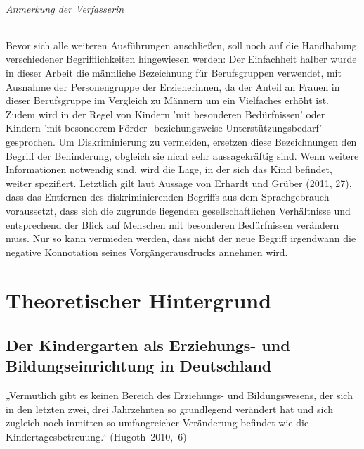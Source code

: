 \paragraph{Anmerkung der Verfasserin}
Bevor sich alle weiteren Ausführungen anschließen, soll noch auf die Handhabung verschiedener Begrifflichkeiten hingewiesen werden: Der Einfachheit halber wurde in dieser Arbeit die männliche Bezeichnung für Berufsgruppen verwendet, mit Ausnahme der Personengruppe der Erzieherinnen, da der Anteil an Frauen in dieser Berufsgruppe im Vergleich zu Männern um ein Vielfaches erhöht ist. 
Zudem wird in der Regel von Kindern 'mit besonderen Bedürfnissen' oder Kindern 'mit besonderem Förder- beziehungsweise Unterstützungsbedarf' gesprochen. Um Diskriminierung zu vermeiden, ersetzen diese Bezeichnungen den Begriff der Behinderung, obgleich sie nicht sehr aussagekräftig sind. Wenn weitere Informationen notwendig sind, wird die Lage, in der sich das Kind befindet, weiter spezifiert. 
Letztlich gilt laut Aussage von Erhardt und Grüber (2011, 27), dass das Entfernen des diskriminierenden Begriffs aus dem Sprachgebrauch voraussetzt, dass sich die zugrunde liegenden gesellschaftlichen Verhältnisse und entsprechend der Blick auf Menschen mit besonderen Bedürfnissen verändern muss. Nur so kann vermieden werden, dass nicht der neue Begriff irgendwann die negative Konnotation seines Vorgängerausdrucks annehmen wird.  

\part{Theoretischer Hintergrund}
\chapter{Der Kindergarten als Erziehungs- und Bildungseinrichtung in Deutschland}

„Vermutlich gibt es keinen Bereich des Erziehungs- und Bildungswesens, der sich in den letzten zwei, drei Jahrzehnten so grundlegend verändert hat und sich zugleich noch inmitten so umfangreicher Veränderung befindet wie die Kindertagesbetreuung.“ (Hugoth~2010,~6)

